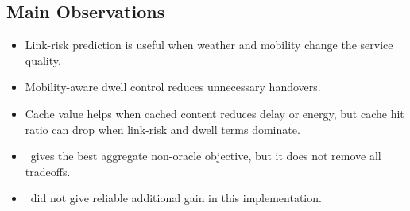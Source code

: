 

\subsection{Main Observations}
\begin{itemize}
    \item Link-risk prediction is useful when weather and mobility change the service quality.
    \item Mobility-aware dwell control reduces unnecessary handovers.
    \item Cache value helps when cached content reduces delay or energy, but cache hit ratio can drop when link-risk and dwell terms dominate.
    \item \psr\ gives the best aggregate non-oracle objective, but it does not remove all tradeoffs.
    \item \etp\ did not give reliable additional gain in this implementation.
\end{itemize}

